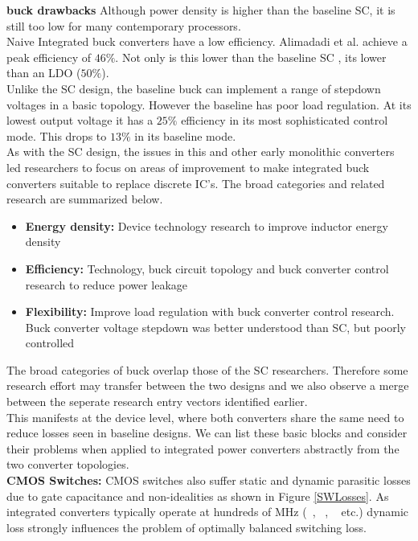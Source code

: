 \documentclass[letterpaper,twocolumn,10pt]{article}
\begin{document}
\textbf{buck drawbacks} Although power density is higher than the baseline SC, it is still too low for many contemporary processors. \\
Naive Integrated buck converters have a low efficiency. Alimadadi et al. \cite{Alimadadi2008} achieve a peak efficiency of $46\%$. Not only is this lower than the baseline SC \cite{Viraj2007}, its lower than an LDO ($50\%$).\\
Unlike the SC design, the baseline buck can implement a range of stepdown voltages in a basic topology. However the baseline has poor load regulation. At its lowest output voltage it has a $25\%$ efficiency in its most sophisticated control mode. This drops to $13\%$ in its baseline mode.\\ 
As with the SC design, the issues in this and other early monolithic converters led researchers to focus on areas of improvement to make integrated buck converters suitable to replace discrete IC's. The broad categories and related research are summarized below.
\begin{itemize}
\item \textbf{Energy density: }Device technology research to improve inductor energy density
\item \textbf{Efficiency: }Technology, buck circuit topology and buck converter control research to reduce power leakage
\item \textbf{Flexibility: }Improve load regulation with buck converter control research. Buck converter voltage stepdown was better understood than SC, but poorly controlled
\end{itemize}
The broad categories of buck overlap those of the SC researchers. Therefore some research effort may transfer between the two designs and we also observe a merge between the seperate research entry vectors identified earlier.\\
This manifests at the device level, where both converters share the same need to reduce losses seen in baseline designs. We can list these basic blocks and consider their problems when applied to integrated power converters abstractly from the two converter topologies.\\  
\textbf{CMOS Switches: }
CMOS switches also suffer static and dynamic parasitic losses due to gate capacitance and non-idealities as shown in Figure \ref{SWLosses}. As integrated converters typically operate at hundreds of MHz (~\cite{Alimadadi2008}, ~\cite{Bathily2012}, ~\cite{Sturcken2013} etc.) dynamic loss strongly influences the problem of optimally balanced switching loss.\\ %
\end{document}

